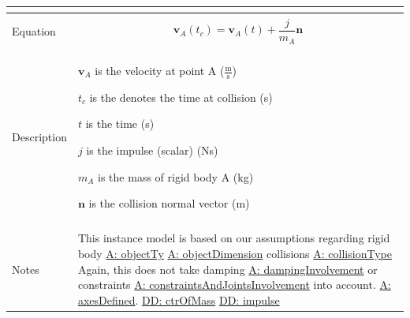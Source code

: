 \documentclass[12pt]{article}
\begin{document}
\begin{minipage}{\textwidth}
\begin{tabular}{p{} p{}}
\begin{displaymath}
                                                                  \end{displaymath}
                                                                  \\ \midrule \\
                                                                  Equation & \begin{displaymath}
                                                                             {\mathbf{v}_{A}}\left({t_{c}}\right)={\mathbf{v}_{A}}\left(t\right)+\frac{j}{{m_{A}}} \mathbf{n}
                                                                             \end{displaymath}
                                                                             \\ \midrule \\
                                                                             Description & \begin{symbDescription}
                                                                                           \item{${\mathbf{v}_{A}}$ is the velocity at point A ($\frac{\text{m}}{\text{s}}$)}
                                                                                           \item{${t_{c}}$ is the denotes the time at collision (s)}
                                                                                           \item{$t$ is the time (s)}
                                                                                           \item{$j$ is the impulse (scalar) (Ns)}
                                                                                           \item{${m_{A}}$ is the mass of rigid body A (kg)}
                                                                                           \item{$\mathbf{n}$ is the collision normal vector (m)}
                                                                                           \end{symbDescription}
                                                                                           \\ \midrule \\
                                                                                           Notes & This instance model is based on our assumptions regarding rigid body \hyperref[A:objectTy]{A: objectTy} \hyperref[A:objectDimension]{A: objectDimension} collisions \hyperref[A:collisionType]{A: collisionType} Again, this does not take damping \hyperref[A:dampingInvolvement]{A: dampingInvolvement} or constraints \hyperref[A:constraintsAndJointsInvolvement]{A: constraintsAndJointsInvolvement} into account. \hyperref[A:axesDefined]{A: axesDefined}. \hyperref[DD:ctrOfMass]{DD: ctrOfMass} \hyperref[DD:impulse]{DD: impulse}

\end{tabular}
\end{minipage}
\end{document}

